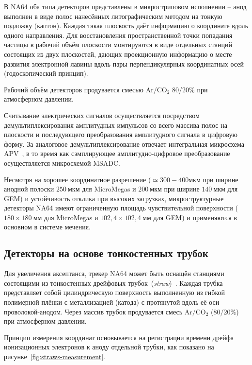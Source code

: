 В NA64 оба типа детекторов представлены в микростриповом исполнении --
анод выполнен в виде полос нанесённых литографическим методом на тонкую
подложку (каптон). Каждая такая плоскость даёт информацию
о координате вдоль одного направления. Для восстановления пространственной
точки попадания частицы в рабочий объём плоскости монтируются в виде
отдельных станций состоящих из двух плоскостей, дающих проекционную
информацию о месте развития электронной лавины вдоль пары перпендикулярных
координатных осей (годоскопический принцип).

Рабочий объём детекторов продувается смесью $\text{Ar}/\text{CO}_2$ 80/20\%
при атмосферном давлении.

Считывание электрических сигналов осуществляется посредством
демультиплексирования амплитудных импульсов со всего массива полос на
плоскости и последующего преобразования амплитудного сигнала в цифровую форму.
За аналоговое демультиплексирование отвечает интегральная
микросхема APV~\cite{apv-jones},
в то время как сэмплирующее амплитудно-цифровое преобразование осуществляется
микросхемой MSADC.

Несмотря на хорошее координатное разрешение ($\simeq 300-400\text{мкм}$
при ширине анодной полоски $250~\text{мкм}$ для MicroMegas и $200~\text{мкм}$
при ширине $140~\text{мкм}$ для GEM) и
устойчивость отклика при высоких загрузках, микроструктурные
детекторы NA64 имеют ограниченную площадь чувствительной поверхности
($180\times180~\text{мм}$ для MicroMegas и $102{,}4\times102{,}4~\text{мм}$
для GEM) и применяются в основном в системе мечения.

\subsection{Детекторы на основе тонкостенных трубок}

Для увеличения аксептанса, трекер NA64 может быть оснащён станциями
состоящими из тонкостенных дрейфовых трубок~(\emph{straw})~\cite{straws-volkov2019, straws-peshekhonov2015}.
Каждая трубка представляет собой цилиндрическую поверхность выполненную
из гибкой полимерной плёнки с металлизацией (катода) с протянутой
вдоль её оси проволокой-анодом. Через массив трубок продувается
смесь $\text{Ar}/\text{CO}_2$ (80/20\%) при атмосферном давлении.

Принцип измерения координат основывается на регистрации времени дрейфа
ионизационных электронов к аноду отдельной трубки, как показано
на рисунке~\ref{fig:straws-measurement}.

